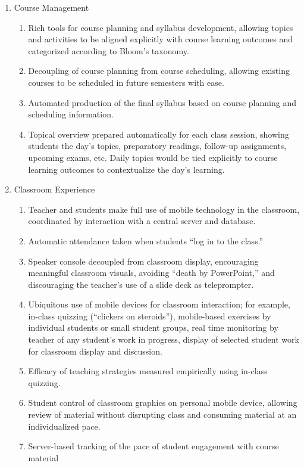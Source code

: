 \documentclass{article}
\begin{document}
\begin{enumerate}
\item{Course Management}
  \begin{enumerate}
  \item Rich tools for course planning and syllabus development, allowing topics and
    activities to be aligned explicitly with course learning outcomes and categorized
    according to Bloom's taxonomy.
  \item Decoupling of course planning from course scheduling, allowing existing courses to
    be scheduled in future semesters with ease.
  \item Automated production of the final syllabus based on course planning and scheduling
    information.
  \item Topical overview prepared automatically for each class session, showing students the
    day's topics, preparatory readings, follow-up assignments, upcoming exams, etc.
    Daily topics would be tied explicitly to course learning outcomes
    to contextualize the day's learning.
  \end{enumerate}
\item{Classroom Experience}
  \begin{enumerate}
  \item Teacher and students make full use of mobile technology in the classroom,
    coordinated by interaction with a central server and database.
  \item Automatic attendance taken when students ``log in to the class.''
  \item Speaker console decoupled from classroom display,
    encouraging meaningful classroom visuals,
    avoiding ``death by PowerPoint,'' and
    discouraging the teacher's use of a slide deck as teleprompter.
  \item Ubiquitous use of mobile devices for classroom interaction; for example,
    in-class quizzing (``clickers on steroids''),
    mobile-based exercises by individual students or small student groups,
    real time monitoring by teacher of any student's work in progress,
    display of selected student work for classroom display and discussion.
  \item Efficacy of teaching strategies measured empirically using in-class quizzing.
  \item Student control of classroom graphics on personal mobile device,
    allowing review of material without disrupting class and
    consuming material at an individualized pace.
  \item Server-based tracking of the pace of student engagement with course material

\end{enumerate}
\end{enumerate}
\end{document}
